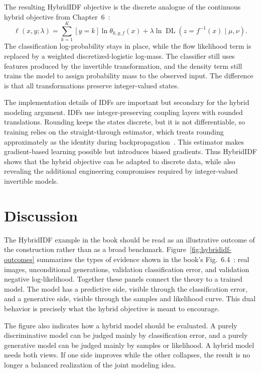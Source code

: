 \documentclass[runningheads]{llncs}
\begin{document}
The resulting HybridIDF objective is the discrete analogue of the continuous
hybrid objective from Chapter~6~\cite{tomczak2024deep}:
\begin{equation}
\ell(x,y;\lambda)
=
\sum_{k=1}^{K}[y=k]\ln\theta_{k,g,f}(x)
+
\lambda\ln
\operatorname{DL}\!\left(z=f^{-1}(x)\mid \mu,\nu\right).
\tag{6.13}
\label{eq:book-6-13}
\end{equation}
The classification log-probability stays in place, while the flow likelihood
term is replaced by a weighted discretized-logistic log-mass. The classifier still
uses features produced by the invertible transformation, and the density term
still trains the model to assign probability mass to the observed input. The
difference is that all transformations preserve integer-valued states.

The implementation details of IDFs are important but secondary for the hybrid
modeling argument. IDFs use integer-preserving coupling layers with rounded
translations. Rounding keeps the states discrete, but it is not differentiable,
so training relies on the straight-through estimator, which treats rounding
approximately as the identity during backpropagation~\cite{hoogeboom2019integer}.
This estimator makes gradient-based learning possible but introduces biased
gradients. Thus HybridIDF shows that the hybrid objective can be adapted to
discrete data, while also revealing the additional engineering compromises
required by integer-valued invertible models.

\section{Discussion}
\label{sec:discussion}

The HybridIDF example in the book should be read as an illustrative outcome of
the construction rather than as a broad benchmark. Figure~\ref{fig:hybrididf-outcomes}
summarizes the types of evidence shown in the book's
Fig.~6.4~\cite{tomczak2024deep}: real images,
unconditional generations, validation classification error, and validation
negative log-likelihood. Together these panels connect the theory to a trained
model. The model has a predictive side, visible through the classification
error, and a generative side, visible through the samples and likelihood curve.
This dual behavior is precisely what the hybrid objective is meant to encourage.

The figure also indicates how a hybrid model should be evaluated. A purely
discriminative model can be judged mainly by classification error, and a purely
generative model can be judged mainly by samples or likelihood. A hybrid model
needs both views. If one side improves while the other collapses, the result is
no longer a balanced realization of the joint modeling idea.
\end{document}
